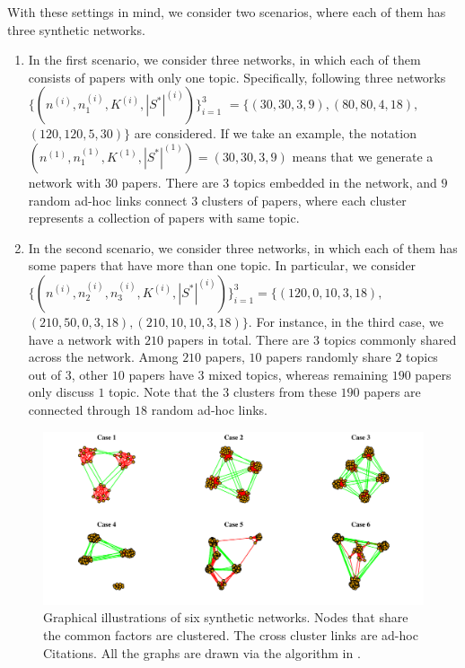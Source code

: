 \documentclass[AMS,STIX1COL]{WileyNJD-v2}
\begin{document}
{With these settings in mind, we consider two scenarios, where each of them has three synthetic networks.

\begin{enumerate}
    \item In the first scenario, we consider three networks, in which each of them consists of papers with only one topic.
        Specifically, following three networks
        $\{(n^{(i)},n_{1}^{(i)},K^{(i)},|S^*|^{(i)})\}_{i=1}^{3}$ $=\{(30,30,3,9), (80,80,4,18),$ $(120,120,5,30)\}$ are considered.
        If we take an example, the notation  $(n^{(1)},n_{1}^{(1)},K^{(1)},|S^*|^{(1)})=(30,30,3,9)$ means that we generate a network with $30$ papers. There are $3$ topics embedded in the network, and $9$ random ad-hoc links connect $3$ clusters of papers, where each cluster represents a collection of papers with same topic.

    \item In the second scenario, we consider three networks, in which each of them has some papers that have more than one topic.
        In particular, we consider $\{(n^{(i)},n_{2}^{(i)},n_{3}^{(i)},K^{(i)},|S^{*}|^{(i)})\}_{i=1}^{3}=
        \{(120,0,10,3,18),$ $(210,50,0,3,18),(210,10,10,3,18)\}$.
        For instance, in the third case, we have a network with $210$ papers in total. There are $3$ topics commonly shared across the network.
        Among $210$ papers, $10$ papers randomly share $2$ topics out of $3$, other $10$ papers have $3$ mixed topics, whereas remaining $190$ papers only discuss $1$ topic.
        Note that the $3$ clusters from these $190$ papers are connected through $18$ random ad-hoc links.
\end{enumerate}

\begin{figure}[htbp]
\includegraphics[width=1\textwidth]{Fig1.pdf}
\caption{Graphical illustrations of six synthetic networks.
Nodes that share the common factors are clustered. The cross cluster links are ad-hoc Citations.
All the graphs are drawn via the algorithm in \cite{fruchterman1991graph}.}
\label{fig:figure1}
\end{figure}

}
\end{document}
